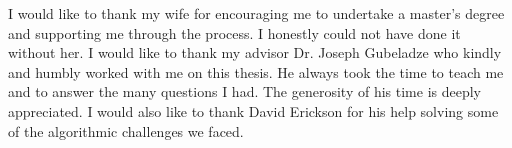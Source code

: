 \begin{acknowledgments}
I would like to thank my wife for encouraging me to undertake a master's degree and supporting me through the process. I honestly could not have done it without her. I would like to thank my advisor Dr. Joseph Gubeladze who kindly and humbly worked with me on this thesis. He always took the time to teach me and to answer the many questions I had. The generosity of his time is deeply appreciated. I would also like to thank David Erickson for his help solving some of the algorithmic challenges we faced. 
\end{acknowledgments}